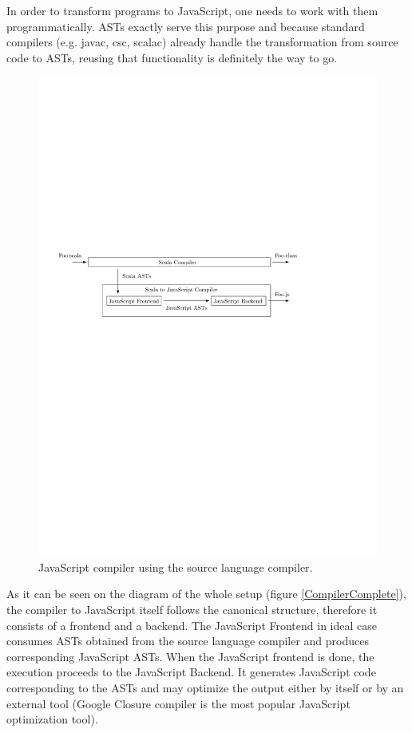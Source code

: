 \documentclass[12pt,a4paper]{report}
\begin{document}
In order to transform programs to JavaScript, one needs to work with them programmatically. ASTs exactly serve this purpose and because standard compilers (e.g. javac, csc, scalac) already handle the transformation from source code to ASTs, reusing that functionality is definitely the way to go.

\begin{figure}[ht]
  \centering
	\includegraphics[width=\linewidth,height=\textheight,keepaspectratio]{img/CompilerPlugging.pdf}
	\caption{JavaScript compiler using the source language compiler.}
	\label{CompilerPlugging}
\end{figure}

As it can be seen on the diagram of the whole setup (figure \ref{CompilerComplete}), the compiler to JavaScript itself follows the canonical structure, therefore it consists of a frontend and a backend. The JavaScript Frontend in ideal case consumes ASTs obtained from the source language compiler and produces corresponding JavaScript ASTs. When the JavaScript frontend is done, the execution proceeds to the JavaScript Backend. It generates JavaScript code corresponding to the ASTs and may optimize the output either by itself or by an external tool (Google Closure compiler\cite{GoogleClosure} is the most popular JavaScript optimization tool).
\end{document}
